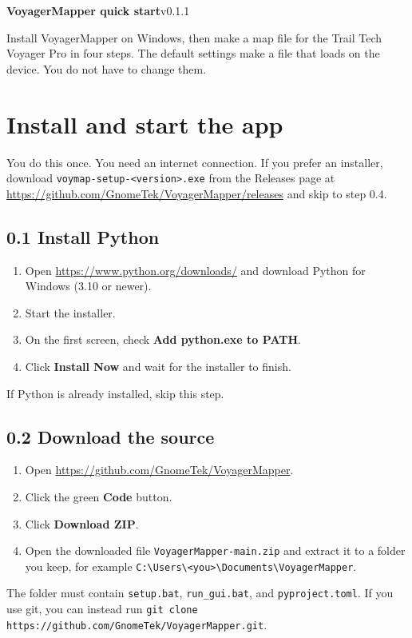 \documentclass[11pt,letterpaper]{article}
\newcommand{\btn}[1]{\textbf{#1}}
\begin{document}
{\LARGE\bfseries VoyagerMapper quick start}\hfill{\small v0.1.1}

\vspace{2pt}
Install VoyagerMapper on Windows, then make a map file for the Trail Tech
Voyager Pro in four steps. The default settings make a file that loads on the
device. You do not have to change them.

\setcounter{section}{-1}
\section{Install and start the app}

You do this once. You need an internet connection. If you prefer an installer,
download \texttt{voymap-setup-<version>.exe} from the Releases page at
\url{https://github.com/GnomeTek/VoyagerMapper/releases} and skip to step 0.4.

\subsection*{0.1 Install Python}
\begin{enumerate}
  \item Open \url{https://www.python.org/downloads/} and download Python for
        Windows (3.10 or newer).
  \item Start the installer.
  \item On the first screen, check \btn{Add python.exe to PATH}.
  \item Click \btn{Install Now} and wait for the installer to finish.
\end{enumerate}
If Python is already installed, skip this step.

\subsection*{0.2 Download the source}
\begin{enumerate}
  \item Open \url{https://github.com/GnomeTek/VoyagerMapper}.
  \item Click the green \btn{Code} button.
  \item Click \btn{Download ZIP}.
  \item Open the downloaded file \texttt{VoyagerMapper-main.zip} and extract it
        to a folder you keep, for example
        \texttt{C:\textbackslash Users\textbackslash <you>\textbackslash Documents\textbackslash VoyagerMapper}.
\end{enumerate}
The folder must contain \texttt{setup.bat}, \texttt{run\_gui.bat}, and
\texttt{pyproject.toml}. If you use git, you can instead run
\texttt{git clone https://github.com/GnomeTek/VoyagerMapper.git}.
\end{document}
